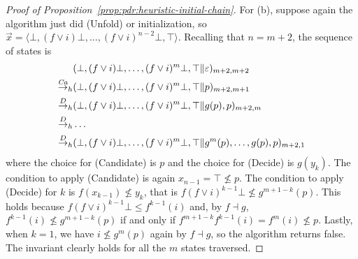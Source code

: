 \begin{proof}[Proof of Proposition~\ref{prop:pdr:heuristic-initial-chain}]
	For (b), suppose again the algorithm just did (Unfold) or initialization, so $\vec{x} = \langle \bot, (f\lor i)\bot, \dots, (f\lor i)^{n-2}\bot, \top \rangle$. Recalling that $n = m + 2$, the sequence of states is
	\begin{align*}
		                     & ( \bot, (f\lor i)\bot, \dots, (f\lor i)^{m}\bot, \top \| \varepsilon )_{m+2,m+2}              \\
		{\stackrel{\mathit{Ca}}{\to}}_{h} & ( \bot, (f\lor i)\bot, \dots, (f\lor i)^{m}\bot, \top \| p )_{m+2,m+1}                        \\
		{\stackrel{D}{\to}}_{h}           & ( \bot, (f\lor i)\bot, \dots, (f\lor i)^{m}\bot, \top \| g (p), p )_{m+2,m}                   \\
		{\stackrel{D}{\to}}_{h}           & \dots                                                                                         \\
		{\stackrel{D}{\to}}_{h}           & ( \bot, (f\lor i)\bot, \dots, (f\lor i)^{m}\bot, \top \| g^{m} (p), \dots, g (p), p )_{m+2,1}
	\end{align*}
	where the choice for (Candidate) is $p$ and the choice for (Decide) is $g (y_{k})$.
	The condition to apply (Candidate) is again $x_{n-1} = \top \not\leq p$.
	The condition to apply (Decide) for $k$ is $f (x_{k-1}) \not \leq y_k$, that is $f (f\lor i)^{k-1}\bot \not \leq g^{m+1-k} (p)$. This holds because $f (f\lor i)^{k-1}\bot \leq f^{k-1} (i)$ and, by $f \dashv g$, $f^{k-1} (i) \not\leq g^{m+1-k} (p)$ if and only if $f^{m+1-k} f^{k-1} (i) = f^{m} (i) \not\leq p$.
	Lastly, when $k = 1$, we have $i \not\leq g^m (p)$ again by $f \dashv g$, so the algorithm returns false.
	The invariant clearly holds for all the $m$ states traversed.
\end{proof}

